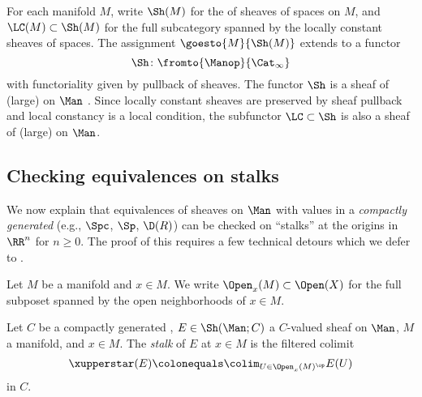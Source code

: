 \begin{example}[(sheaves)]\label{ex:ShLC}
	For each manifold $ M $, write $ \Sh(M) $ for the \category of sheaves of spaces on $ M $, and $ \LC(M) \subset \Sh(M) $ for the full subcategory spanned by the locally constant sheaves of spaces.
	The assignment $ \goesto{M}{\Sh(M)} $ extends to a functor
	\begin{equation*}
		\Sh \colon \fromto{\Manop}{\Cat_{\infty}}
	\end{equation*} 
	with functoriality given by pullback of sheaves.
	The functor $ \Sh $ is a sheaf of (large) \categories on $ \Man $ .
	Since locally constant sheaves are preserved by sheaf pullback and local constancy is a local condition, the subfunctor $ \LC \subset \Sh $ is also a sheaf of (large) \categories on $ \Man $.
\end{example}


\subsection{Checking equivalences on stalks}\label{subsec:checkonstalks}

We now explain that equivalences of sheaves on $ \Man $ with values in a \textit{compactly generated} \category
(e.g., $ \Spc $, $ \Sp $, $ \D(R) $) can be checked on ``stalks'' at the origins in $ \RR^n $ for $ n \geq 0 $.
The proof of this requires a few technical detours which we defer to .

\begin{notation}
	Let $ M $ be a manifold and $ x \in M $.
	We write $ \Open_x(M) \subset \Open(X) $ for the full subposet spanned by the open neighborhoods of $ x \in M $.
\end{notation}

\begin{definition}\label{def:stalkCG}
	Let $ C $ be a compactly generated \category, $ E \in \Sh(\Man;C) $ a $ C $-valued sheaf on $ \Man $, $ M $ a manifold, and $ x \in M $.
	The \textit{stalk} of $ E $ at $ x \in M $ is the filtered colimit
	\begin{equation}\label{eq:stalkfilteredcolim}
		\xupperstar (E) \colonequals \colim_{U \in \Open_x(M)^{\op}} E(U)
	\end{equation}
	in $ C $.
\end{definition}

